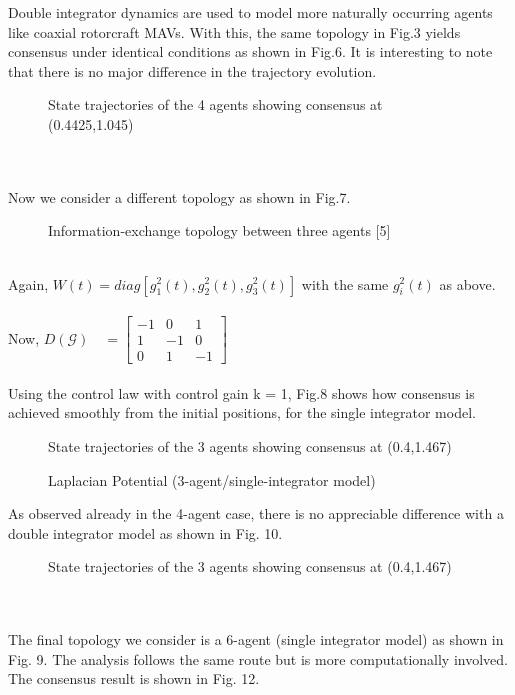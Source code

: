 \documentclass[journal]{IEEEtran}
\begin{document}
 Double integrator dynamics are used to model more naturally occurring agents like coaxial rotorcraft MAVs. With this, the same topology  in Fig.3 yields consensus under identical conditions as shown in Fig.6. It is interesting to note that there is no major difference in the trajectory evolution.
\begin{figure}[h]
\caption{State trajectories of the 4 agents showing consensus at (0.4425,1.045)}
\end{figure}
\\\\
Now we consider a different topology as shown in Fig.7. 
\begin{figure}[h]
\caption{Information-exchange topology between three agents [5]}
\end{figure}\\
Again, $W(t) = diag[g_1^2(t),g_2^2(t),g_3^2(t)]$ with the same $g_i^2(t)$ as above.  \\\\Now, $ D(\mathcal{G})\quad = \begin{bmatrix}
-1&0&1\\1&-1&0\\0&1&-1
\end{bmatrix}$ \\\\
Using the control law with control gain k = 1, Fig.8 shows how consensus is achieved smoothly from the initial positions, for the single integrator model. 
\begin{figure}[h]
\caption{State trajectories of the 3 agents showing consensus at (0.4,1.467)}
\end{figure}
\begin{figure}[h]
\caption{Laplacian Potential (3-agent/single-integrator model)}
\end{figure}
As observed already in the 4-agent case, there is no appreciable difference with a double integrator model as shown in Fig. 10.
\begin{figure}[h]
\caption{State trajectories of the 3 agents showing consensus at (0.4,1.467)}
\end{figure}\\\\
The final topology we consider is a 6-agent (single integrator model) as shown in Fig. 9. The analysis follows the same route but is more computationally involved. The consensus result is shown in Fig. 12. \\\\\\
\end{document}
